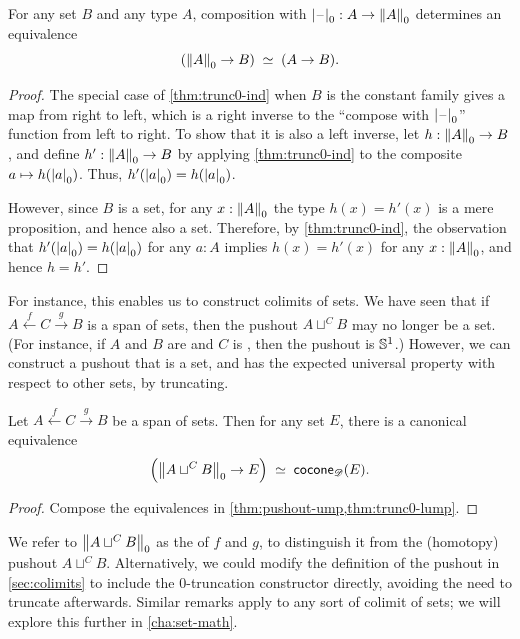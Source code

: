 \begin{lem}\label{thm:trunc0-lump}
  For any set $B$ and any type $A$, composition with $\tprojf0:A\to \trunc0A$ determines an equivalence
  \[ \eqvspaced{(\trunc0A\to B)}{(A\to B)}. \]
\end{lem}
\begin{proof}
  The special case of \cref{thm:trunc0-ind} when $B$ is the constant family gives a map from right to left, which is a right inverse to the ``compose with $\tprojf0$'' function from left to right.
  To show that it is also a left inverse, let $h:\trunc0A\to B$, and define $h':\trunc0A\to B$ by applying \cref{thm:trunc0-ind} to the composite $a\mapsto h(\tproj0a)$.
  Thus, $h'(\tproj0a)=h(\tproj0a)$.

  However, since $B$ is a set, for any $x:\trunc0A$ the type $h(x)=h'(x)$ is a mere proposition, and hence also a set.
  Therefore, by \cref{thm:trunc0-ind}, the observation that $h'(\tproj0a)=h(\tproj0a)$ for any $a:A$ implies $h(x)=h'(x)$ for any $x:\trunc0A$, and hence $h=h'$.
\end{proof}

%
%
For instance, this enables us to construct colimits of sets.
We have seen that if $A \xleftarrow{f} C \xrightarrow{g} B$ is a span of sets, then the pushout $A\sqcup^C B$ may no longer be a set.
(For instance, if $A$ and $B$ are \unit and $C$ is \bool, then the pushout is $\Sn^1$.)
However, we can construct a pushout that is a set, and has the expected universal property with respect to other sets, by truncating.

\begin{lem}\label{thm:set-pushout}
  Let $A \xleftarrow{f} C \xrightarrow{g} B$ be a span of sets.
  Then for any set $E$, there is a canonical equivalence
  \[ \Parens{\trunc0{A\sqcup^C B} \to E} \;\eqvsym\; \cocone{\Ddiag}{E}. \]
\end{lem}
\begin{proof}
  Compose the equivalences in \cref{thm:pushout-ump,thm:trunc0-lump}.
\end{proof}

We refer to $\trunc0{A\sqcup^C B}$ as the 
%
of $f$ and $g$, to distinguish it from the (homotopy) pushout $A\sqcup^C B$.
Alternatively, we could modify the definition of the pushout in \cref{sec:colimits} to include the $0$-truncation constructor directly, avoiding the need to truncate afterwards.
Similar remarks apply to any sort of colimit of sets; we will explore this further in \cref{cha:set-math}.

